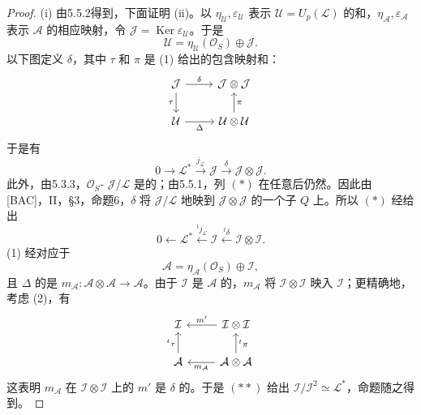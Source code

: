 \begin{proof}
(i) 由5.5.2得到，下面证明 (ii)。以 $\eta_{\mathcal U},\varepsilon_{\mathcal U}$ 表示 $\mathcal U=U_p(\mathcal L)$ 的和，$\eta_{\mathcal A},\varepsilon_{\mathcal A}$ 表示 $\mathcal A$ 的相应映射，令 $\mathcal J=\operatorname{Ker}\varepsilon_{\mathcal U}$。于是
\[
 \mathcal U=\eta_{\mathcal U}(\mathcal O_S)\oplus\mathcal J.\tag{1}
\]
以下图定义 $\delta$，其中 $\tau$ 和 $\pi$ 是 (1) 给出的包含映射和：
\[
\begin{tikzcd}
 \mathcal J\arrow[r,"\delta"]\arrow[d,"\tau"']&\mathcal J\otimes\mathcal J\\
 \mathcal U\arrow[r,"\Delta"']&\mathcal U\otimes\mathcal U\arrow[u,"\pi"']
\end{tikzcd}
\]
于是有
\[
 0\longrightarrow\mathcal L^*\xrightarrow{j_{\mathcal L}}\mathcal J
 \xrightarrow{\delta}\mathcal J\otimes\mathcal J.\tag{*}
\]
此外，由5.3.3，$\mathcal O_S$- $\mathcal J/\mathcal L$ 是的；由5.5.1，列 $(*)$ 在任意后仍然。因此由 [BAC]，II，\S3，命题6，$\delta$ 将 $\mathcal J/\mathcal L$ 地映到 $\mathcal J\otimes\mathcal J$ 的一个子 $Q$ 上。所以 $(*)$ 经给出
\[
 0\longleftarrow\mathcal L^*\xleftarrow{{}^tj_{\mathcal L}}\mathcal I
 \xleftarrow{{}^t\delta}\mathcal I\otimes\mathcal I.\tag{**}
\]
 (1) 经对应于
\[
 \mathcal A=\eta_{\mathcal A}(\mathcal O_S)\oplus\mathcal I,\tag{2}
\]
且 $\Delta$ 的是 $m_{\mathcal A}:\mathcal A\otimes\mathcal A\to\mathcal A$。由于 $\mathcal I$ 是 $\mathcal A$ 的，$m_{\mathcal A}$ 将 $\mathcal I\otimes\mathcal I$ 映入 $\mathcal I$；更精确地，考虑 (2)，有
\[
\begin{tikzcd}
 \mathcal I&\mathcal I\otimes\mathcal I\arrow[l,"m'"']\\
 \mathcal A\arrow[u,"{}^t\tau"]&\mathcal A\otimes\mathcal A\arrow[l,"m_{\mathcal A}"]\arrow[u,"{}^t\pi"']
\end{tikzcd}
\]
这表明 $m_{\mathcal A}$ 在 $\mathcal I\otimes\mathcal I$ 上的 $m'$ 是 $\delta$ 的。于是 $(**)$ 给出 $\mathcal I/\mathcal I^2\simeq\mathcal L^*$，命题随之得到。
\end{proof}

